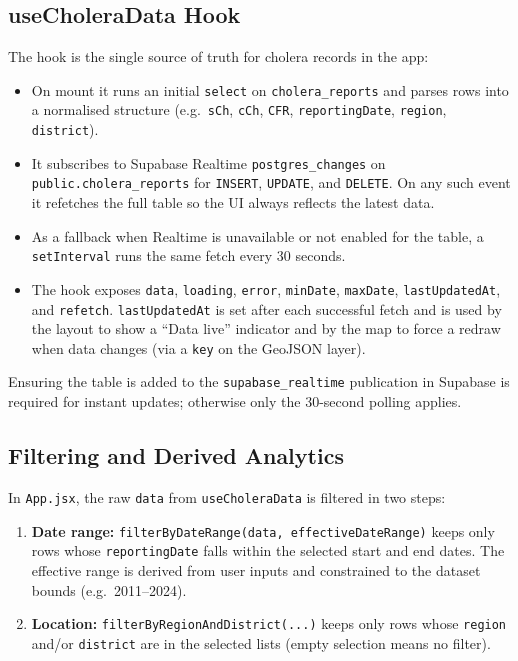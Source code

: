 \documentclass[11pt,a4paper]{article}
\begin{document}
\subsection{useCholeraData Hook}

The hook is the single source of truth for cholera records in the app:

\begin{itemize}[noitemsep]
    \item On mount it runs an initial \texttt{select} on \texttt{cholera\_reports} and parses rows into a normalised structure (e.g.\ \texttt{sCh}, \texttt{cCh}, \texttt{CFR}, \texttt{reportingDate}, \texttt{region}, \texttt{district}).
    \item It subscribes to Supabase Realtime \texttt{postgres\_changes} on \texttt{public.cholera\_reports} for \texttt{INSERT}, \texttt{UPDATE}, and \texttt{DELETE}. On any such event it refetches the full table so the UI always reflects the latest data.
    \item As a fallback when Realtime is unavailable or not enabled for the table, a \texttt{setInterval} runs the same fetch every 30 seconds.
    \item The hook exposes \texttt{data}, \texttt{loading}, \texttt{error}, \texttt{minDate}, \texttt{maxDate}, \texttt{lastUpdatedAt}, and \texttt{refetch}. \texttt{lastUpdatedAt} is set after each successful fetch and is used by the layout to show a ``Data live'' indicator and by the map to force a redraw when data changes (via a \texttt{key} on the GeoJSON layer).
\end{itemize}

Ensuring the table is added to the \texttt{supabase\_realtime} publication in Supabase is required for instant updates; otherwise only the 30-second polling applies.

\subsection{Filtering and Derived Analytics}

In \texttt{App.jsx}, the raw \texttt{data} from \texttt{useCholeraData} is filtered in two steps:

\begin{enumerate}[noitemsep]
    \item \textbf{Date range:} \texttt{filterByDateRange(data, effectiveDateRange)} keeps only rows whose \texttt{reportingDate} falls within the selected start and end dates. The effective range is derived from user inputs and constrained to the dataset bounds (e.g.\ 2011--2024).
    \item \textbf{Location:} \texttt{filterByRegionAndDistrict(...)} keeps only rows whose \texttt{region} and/or \texttt{district} are in the selected lists (empty selection means no filter).
\end{enumerate}
\end{document}
